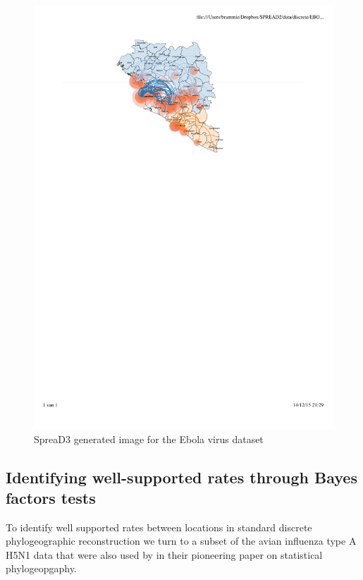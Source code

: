\documentclass[english]{paper}
\begin{document}
\begin{figure}[!H]
\centering
\includegraphics[width=1\textwidth]{./figures/Fig6_ebov.pdf} %
\caption{SpreaD3 generated image for the Ebola virus dataset}
\label{fig:ebov_final}
\end{figure}


\subsection{Identifying well-supported rates through Bayes factors tests}
\label{BayesFactor}

To identify well supported rates between locations in standard discrete phylogeographic reconstruction we turn to a subset of the avian influenza type A H5N1 data that were also used by \citet{lemey:2009fk} in their pioneering paper on statistical phylogeopgaphy.
\end{document}

